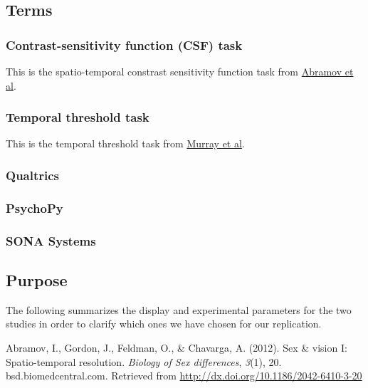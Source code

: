 \documentclass[]{article}
\begin{document}
\hypertarget{terms}{%
\subsection{Terms}\label{terms}}

\hypertarget{contrast-sensitivity-function-csf-task}{%
\subsubsection{Contrast-sensitivity function (CSF)
task}\label{contrast-sensitivity-function-csf-task}}

This is the spatio-temporal constrast sensitivity function task from
\href{https://doi.org/10.1186/2042-6410-3-20}{Abramov et al}.

\hypertarget{temporal-threshold-task}{%
\subsubsection{Temporal threshold task}\label{temporal-threshold-task}}

This is the temporal threshold task from
\href{https://doi.org/10.1016/j.cub.2018.06.014}{Murray et al}.

\hypertarget{qualtrics}{%
\subsubsection{Qualtrics}\label{qualtrics}}

\hypertarget{psychopy}{%
\subsubsection{PsychoPy}\label{psychopy}}

\hypertarget{sona-systems}{%
\subsubsection{SONA Systems}\label{sona-systems}}

\hypertarget{purpose-2}{%
\subsection{Purpose}\label{purpose-2}}

The following summarizes the display and experimental parameters for the
two studies in order to clarify which ones we have chosen for our
replication.

Abramov, I., Gordon, J., Feldman, O., \& Chavarga, A. (2012). Sex \&
vision I: Spatio-temporal resolution. \emph{Biology of Sex differences},
\emph{3}(1), 20. bsd.biomedcentral.com. Retrieved from
\url{http://dx.doi.org/10.1186/2042-6410-3-20}
\end{document}

